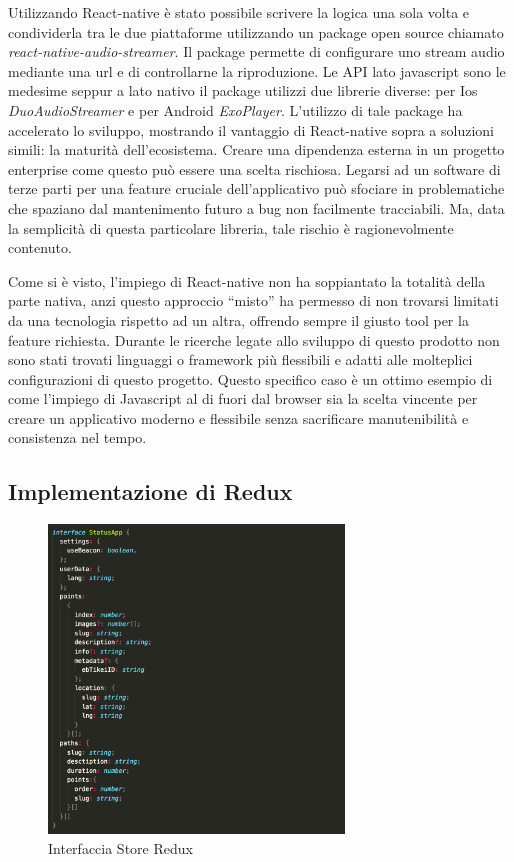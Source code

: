 Utilizzando React-native è stato possibile scrivere la logica una sola volta e condividerla tra le due piattaforme utilizzando un package open source chiamato \emph{react-native-audio-streamer}. Il package permette di configurare uno stream audio mediante una url e di controllarne la riproduzione. Le API lato javascript sono le medesime seppur a lato nativo il package utilizzi due librerie diverse: per Ios \emph{DuoAudioStreamer} e per Android \emph{ExoPlayer}. L’utilizzo di tale package ha accelerato lo sviluppo, mostrando il vantaggio di React-native sopra a soluzioni simili: la maturità dell'ecosistema. Creare una dipendenza esterna in un progetto enterprise come questo può essere una scelta rischiosa. Legarsi ad un software di terze parti per una feature cruciale dell’applicativo può sfociare in problematiche che spaziano dal mantenimento futuro a bug non facilmente tracciabili. Ma, data la semplicità di questa particolare libreria, tale rischio è ragionevolmente contenuto.\vspace{2mm}

Come si è visto, l’impiego di React-native non ha soppiantato la totalità della parte nativa, anzi questo approccio “misto” ha permesso di non trovarsi limitati da una tecnologia rispetto ad un altra, offrendo sempre il giusto tool per la feature richiesta. Durante le ricerche legate allo sviluppo di questo prodotto non sono stati trovati linguaggi o framework più flessibili e adatti alle molteplici configurazioni di questo progetto. Questo specifico caso è un ottimo esempio di come l’impiego di Javascript al di fuori dal browser sia la scelta vincente per creare un applicativo moderno e flessibile senza sacrificare manutenibilità e consistenza nel tempo.

\subsection{Implementazione di Redux}\vspace{5mm}

\begin{figure}[h]
\centering
\includegraphics[width=0.7\textwidth]{images/store.png}
\caption{Interfaccia Store Redux}
\end{figure}

